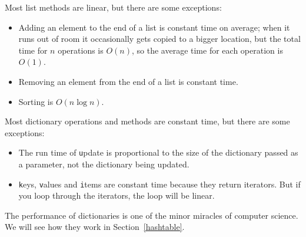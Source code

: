 \documentclass[
DIV=11,
fontsize=12,
twoside,
headinclude=false,
titlepage=firstiscover,
abstract=true,
headsepline=true,
footsepline=true,
chapterprefix=true, %
headings=big,
bibliography=totoc,%
captions=tableheading
]{scrbook}
\theoremstyle{definition}
\begin{document}
Most list methods are linear, but there are some exceptions:

\begin{itemize}

\item Adding an element to the end of a list is constant time on
average; when it runs out of room it occasionally gets copied
to a bigger location, but the total time for $n$ operations
is $O(n)$, so the average time for each
operation is $O(1)$.

\item Removing an element from the end of a list is constant time.

\item Sorting is $O(n \log n)$.

\end{itemize}

Most dictionary operations and methods are constant time, but
there are some exceptions:

\begin{itemize}

\item The run time of {\texttt update} is
  proportional to the size of the dictionary passed as a parameter,
  not the dictionary being updated.

\item {\texttt keys}, {\texttt values} and {\texttt items} are constant time because 
  they return iterators.  But
  if you loop through the iterators, the loop will be linear.

\end{itemize}

The performance of dictionaries is one of the minor miracles of
computer science.  We will see how they work in
Section~\ref{hashtable}.
\end{document}
